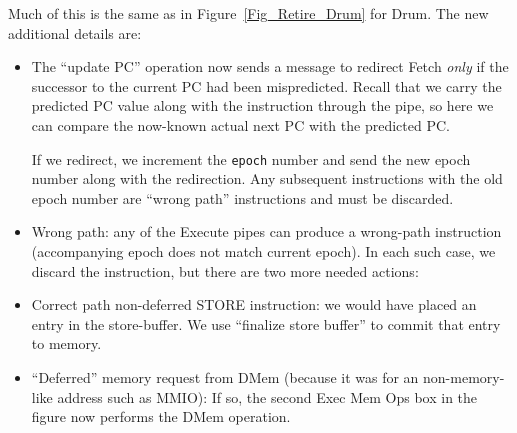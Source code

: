 Much of this is the same as in Figure~\ref{Fig_Retire_Drum} for Drum.
The new additional details are:

\begin{itemize}

 \item The ``update PC'' operation now sends a message to redirect
       Fetch \emph{only} if the successor to the current PC had been
       mispredicted.  Recall that we carry the predicted PC value
       along with the instruction through the pipe, so here we can
       compare the now-known actual next PC with the predicted PC.

       If we redirect, we increment the \verb|epoch| number and send
       the new epoch number along with the redirection.  Any
       subsequent instructions with the old epoch number are ``wrong
       path'' instructions and must be discarded.

 \item Wrong path: any of the Execute pipes can produce a wrong-path
       instruction (accompanying epoch does not match current epoch).
       In each such case, we discard the instruction, but there are two more needed actions:


 \item Correct path non-deferred STORE instruction: we would have
        placed an entry in the store-buffer.  We use ``finalize store
        buffer'' to commit that entry to memory.

 \item ``Deferred'' memory request from DMem (because it was for an
       non-memory-like address such as MMIO): If so, the second Exec
       Mem Ops box in the figure now performs the DMem operation.

\end{itemize}

